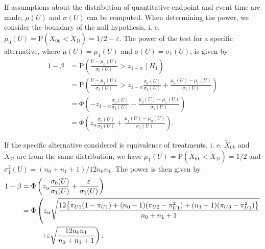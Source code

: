 \documentclass[bimj,fleqn]{w-art}
\theoremstyle{plain}
\theoremstyle{definition}
\begin{document}
If assumptions about the distribution of quantitative endpoint and event time
are made, $\mu(U)$ and $\sigma(U)$ can be computed. When determining the power,
we consider the boundary of the null hypothesis, i. e.
$\mu_0(U) = \text{P}(\widetilde{X}_{0k} < \widetilde{X}_{1l}) = 1/2 - \varepsilon$.
The power of the test for a specific alternative, where $\mu(U) = \mu_1(U)$
and $\sigma(U) = \sigma_1(U)$, is given by
\begin{align*}
  1 - \beta &= \text{P} \left(\frac{U - \mu_0(U)}{\sigma_0(U)}  >
                                 z_{1-\alpha} \mid H_1 \right) \\
            &= \text{P} \left(\frac{U - \mu_1(U)}{\sigma_1(U)}  >
                                 z_{1-\alpha}\frac{\sigma_0(U)}{\sigma_1(U)} +
                                 \frac{\mu_0(U) - \mu_1(U)}{\sigma_1(U)} \right) \\
            &= \Phi\left(- z_{1-\alpha}\frac{\sigma_0(U)}{\sigma_1(U)} -
                            \frac{\mu_0(U) - \mu_1(U)}{\sigma_1(U)} \right) \\
            &= \Phi\left(z_{\alpha}\frac{\sigma_0(U)}{\sigma_1(U)} +
                            \frac{\mu_1(U) - \mu_0(U)}{\sigma_1(U)} \right) .
\end{align*}

If the specific alternative considered is equivalence of treatments, i. e.
$\widetilde{X}_{0k}$ and $\widetilde{X}_{1l}$ are from the same distribution,
we have $\mu_1(U) = \text{P}(\widetilde{X}_{0k} < \widetilde{X}_{1l}) = 1/2$
and $\sigma^2_1(U) = (n_0 + n_1 +1) /12 n_0 n_1$. The power is
then given by
\begin{align*}
1 - \beta &= \Phi\left(z_{\alpha}\frac{\sigma_0(U)}{\sigma_1(U)} +
                            \frac{\varepsilon}{\sigma_1(U)} \right) \\
          &= \Phi\left(z_{\alpha} \sqrt{\frac{12 \big\{ \pi_{U1} (1 - \pi_{U1}) +
                                  (n_0 - 1) (\pi_{U2} - \pi_{U1}^2) +
                                  (n_1 - 1) (\pi_{U3} - \pi_{U1}^2) \big\}}{n_0 + n_1 +1}} \right.\\
          &{\hphantom{= \Phi\bigg(}} \left. + \varepsilon \sqrt{\frac{12 n_0 n_1 }{n_0 + n_1 +1}} \right) .
\end{align*}
\end{document}
